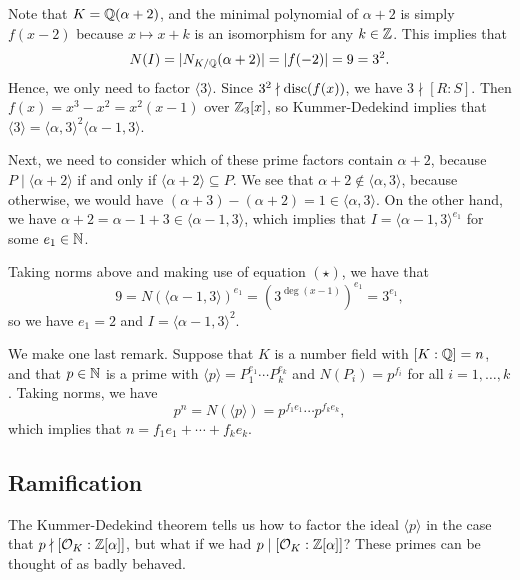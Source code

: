 Note that $K = \mathbb{Q}(\alpha + 2)$, and the minimal polynomial of $\alpha + 2$ is simply $f(x - 2)$ 
because $x \mapsto x + k$ is an isomorphism for any $k \in \mathbb{Z}$. This implies that 
\[ N(I) = |N_{K/\mathbb{Q}}(\alpha + 2)| = |f(-2)| = 9 = 3^2. \] 
Hence, we only need to factor $\langle 3 \rangle$. Since $3^2 \nmid \operatorname{disc}(f(x))$, 
we have $3 \nmid [R : S]$. Then $f(x) = x^3 - x^2 = x^2(x - 1)$ over $\mathbb{Z}_3[x]$, 
so Kummer-Dedekind implies that $\langle 3 \rangle = \langle \alpha, 3 \rangle^2 
\langle \alpha - 1, 3 \rangle$. 

Next, we need to consider which of these prime factors contain 
$\alpha + 2$, because $P \mid \langle \alpha + 2 \rangle$ if and only if 
$\langle \alpha + 2 \rangle \subseteq P$. We see that $\alpha + 2 
\notin \langle \alpha, 3 \rangle$, because otherwise, we would have 
$(\alpha + 3) - (\alpha + 2) = 1 \in \langle \alpha, 3 \rangle$. 
On the other hand, we have $\alpha + 2 = \alpha - 1 + 3 \in \langle 
\alpha - 1, 3 \rangle$, which implies that $I = \langle \alpha-1, 3 
\rangle^{e_1}$ for some $e_1 \in \mathbb{N}$. 

Taking norms above and making use of equation $(\star)$, we have that 
\[ 9 = N(\langle \alpha - 1, 3 \rangle)^{e_1} = (3^{\deg(x-1)})^{e_1} 
= 3^{e_1}, \]
so we have $e_1 = 2$ and $I = \langle \alpha-1, 3 \rangle^2$. 

We make one last remark. Suppose that $K$ is a number field with 
$[K : \mathbb{Q}] = n$, and that $p \in \mathbb{N}$ is a prime with 
$\langle p \rangle = P_1^{e_1} \cdots P_k^{e_k}$ and $N(P_i) = p^{f_i}$
for all $i = 1, \dots, k$. Taking norms, we have 
\[ p^n = N(\langle p \rangle) = p^{f_1e_1} \cdots p^{f_ke_k}, \]
which implies that $n = f_1 e_1 + \cdots + f_k e_k$. 

\subsection{Ramification} \label{subsec:3.10}
The Kummer-Dedekind theorem tells us how to factor the ideal 
$\langle p \rangle$ in the case that $p \nmid [\mathcal{O}_K : \mathbb{Z}[\alpha]]$, 
but what if we had $p \mid [\mathcal{O}_K : \mathbb{Z}[\alpha]]$? These 
primes can be thought of as badly behaved. 

